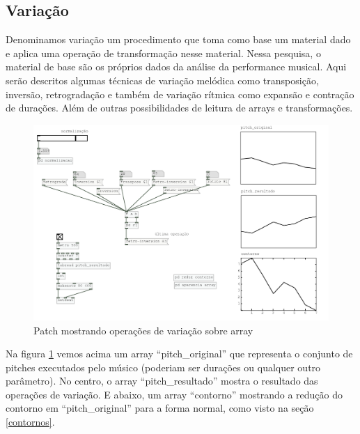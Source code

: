 \documentclass{ppgmus}
\begin{document}

\subsection{Variação}
\label{varia-contorno}


Denominamos variação um procedimento que toma como base um
material dado e aplica uma operação de transformação nesse material.
Nessa pesquisa, o material de base são os próprios dados da 
análise da performance musical.
Aqui serão descritos algumas técnicas de variação melódica como
transposição, inversão, retrogradação e também de variação rítmica
como expansão e contração de durações. Além de outras possibilidades
de leitura de arrays e transformações.

\begin{figure}
\includegraphics[scale=.6]{variacoes-contorno}
\caption{Patch mostrando operações de variação sobre array}
\label{variacoes-contorno}
\end{figure}  

Na figura \ref{variacoes-contorno} vemos acima um array ``pitch\_original'' que representa
o conjunto de pitches executados pelo músico (poderiam ser durações ou qualquer
outro parâmetro). No centro, o array ``pitch\_resultado'' mostra o resultado das  
operações de variação. E abaixo, um array ``contorno'' mostrando a redução do contorno em
``pitch\_original'' para a forma normal, como visto na seção \ref{contornos}.
\end{document}
